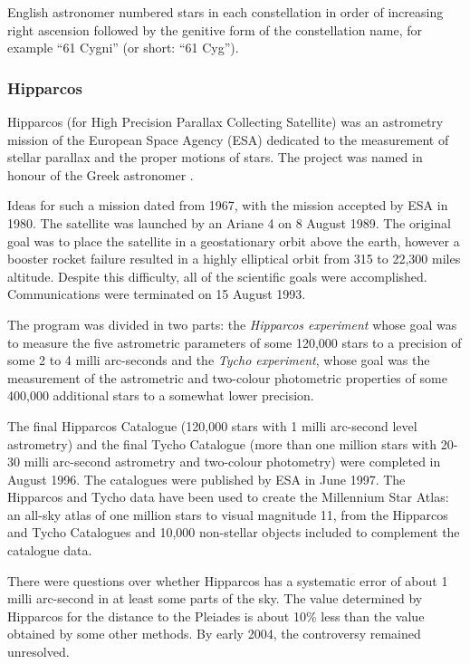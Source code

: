 English astronomer  numbered stars in each
constellation in order of increasing right ascension followed by the genitive
form of the constellation name, for example ``61 Cygni'' (or short: ``61 Cyg'').

\subsubsection{Hipparcos}
\label{sec:Phenomena:StarNames:Hipparcos}

Hipparcos (for High Precision Parallax Collecting Satellite) was an
astrometry mission of the European Space Agency (ESA) dedicated to the
measurement of stellar parallax and the proper motions of stars. The
project was named in honour of the Greek astronomer .

Ideas for such a mission dated from 1967, with the mission accepted by
ESA in 1980. The satellite was launched by an Ariane 4 on 8 August 1989.
The original goal was to place the satellite in a geostationary orbit
above the earth, however a booster rocket failure resulted in a highly
elliptical orbit from 315 to 22,300 miles altitude. Despite this
difficulty, all of the scientific goals were accomplished.
Communications were terminated on 15 August 1993.

The program was divided in two parts: the \emph{Hipparcos experiment}
whose goal was to measure the five astrometric parameters of some
120,000 stars to a precision of some 2 to 4 milli arc-seconds and the
\emph{Tycho experiment}, whose goal was the measurement of the
astrometric and two-colour photometric properties of some 400,000
additional stars to a somewhat lower precision.

The final Hipparcos Catalogue (120,000 stars with 1 milli arc-second
level astrometry) and the final Tycho Catalogue (more than one million
stars with 20-30 milli arc-second astrometry and two-colour photometry)
were completed in August 1996. The catalogues were published by ESA in
June 1997. The Hipparcos and Tycho data have been used to create the
Millennium Star Atlas: an all-sky atlas of one million stars to visual
magnitude 11, from the Hipparcos and Tycho Catalogues and 10,000
non-stellar objects included to complement the catalogue data.

There were questions over whether Hipparcos has a systematic error of
about 1 milli arc-second in at least some parts of the sky. The value
determined by Hipparcos for the distance to the Pleiades is about 10\%
less than the value obtained by some other methods. By early 2004, the
controversy remained unresolved.

